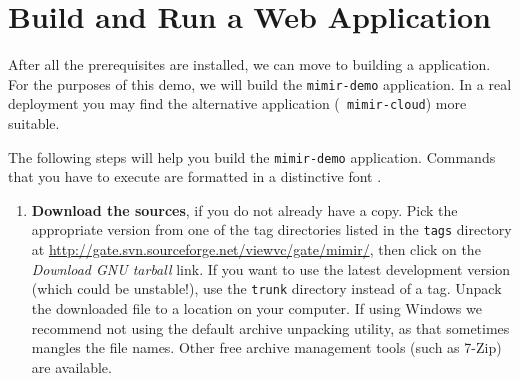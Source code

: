 \section{Build and Run a \Mimir{} Web Application}
%
After all the prerequisites are installed, we can move to building a \Mimir{}
application. For the purposes of this demo, we will build the {\tt mimir-demo}
application. In a real deployment you may find the alternative application ({\tt
mimir-cloud}) more suitable.

The following steps will help you build the {\tt mimir-demo} application.
Commands that you have to execute are formatted in a distinctive font
.
\begin{enumerate}
  \item {\bf Download the \Mimir{} sources}, if you do not already have a copy.
  Pick the appropriate version from one of the tag directories listed in the
  {\tt tags} directory at
  \url{http://gate.svn.sourceforge.net/viewvc/gate/mimir/}, then click on the
  {\em Download GNU tarball} link. If you want to use the latest development
  version (which could be unstable!), use the {\tt trunk} directory instead of a
  tag. Unpack the downloaded file to a location on your computer. If using
  Windows we recommend not using the default archive unpacking utility, as that
  sometimes mangles the file names. Other free archive management tools (such as
  7-Zip) are available.
  

\end{enumerate}
